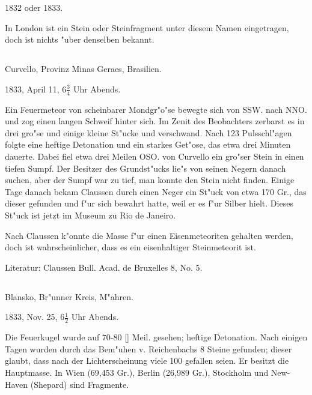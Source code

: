 \documentclass[a4paper, 11pt, oneside]{article}
\begin{document}
1832 oder 1833.

In London ist ein Stein oder Steinfragment unter diesem Namen eingetragen, doch ist nichts "uber denselben bekannt.

\subsection{}
\LARGE
\paragraph{}
Curvello, Provinz Minas Geraes, Brasilien.

1833, April 11, $\mathfrak{6\frac{3}{4}}$ Uhr Abends.

Ein Feuermeteor von scheinbarer Mondgr"o"se bewegte sich von SSW. nach NNO. und zog einen langen Schweif hinter sich. Im Zenit des Beobachters zerbarst es in drei gro"se und einige kleine St"ucke und verschwand. Nach 123 Pulsschl"agen folgte eine heftige Detonation und ein starkes Get"ose, das etwa drei Minuten dauerte. Dabei fiel etwa drei Meilen OSO. von Curvello ein gro"ser Stein in einen tiefen Sumpf. Der Besitzer des Grundst"ucks lie"s von seinen Negern danach suchen, aber der Sumpf war zu tief, man konnte den Stein nicht finden. Einige Tage danach bekam Claussen durch einen Neger ein St"uck von etwa 170 Gr., das dieser gefunden und f"ur sich bewahrt hatte, weil er es f"ur Silber hielt. Dieses St"uck ist jetzt im Museum zu Rio de Janeiro.

Nach Claussen k"onnte die Masse f"ur einen Eisenmeteoriten gehalten werden, doch ist wahrscheinlicher, dass es ein eisenhaltiger Steinmeteorit ist.

\normalsize
Literatur: Claussen Bull. Acad. de Bruxelles 8, No. 5.

\subsection{}
\LARGE
\paragraph{}
Blansko, Br"unner Kreis, M"ahren.

1833, Nov. 25, $\mathfrak{6\frac{1}{2}}$ Uhr Abends.

Die Feuerkugel wurde auf 70-80 [] Meil. gesehen; heftige Detonation. Nach einigen Tagen wurden durch das Bem"uhen v. Reichenbachs 8 Steine gefunden; dieser glaubt, dass nach der Lichterscheinung viele 100 gefallen seien. Er besitzt die Hauptmasse. In Wien (69,453 Gr.), Berlin (26,989 Gr.), Stockholm und New-Haven (Shepard) sind Fragmente.
\end{document}
